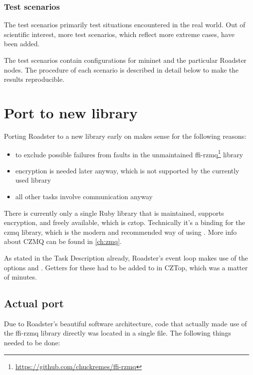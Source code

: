 \subsubsection{Test scenarios}
The test scenarios primarily test situations encountered in the real world. Out
of scientific interest, more test scenarios, which reflect more extreme cases,
have been added.

The test scenarios contain configurations for mininet and the particular Roadster nodes.
The procedure of each scenario is described in detail below to make the results reproducible.


\section{Port to new \zmq library}\label{sec:approach:port}
Porting Roadster to a new \zmq library early on makes sense for the following reasons:

\begin{itemize}
\item to exclude possible failures from faults in the unmaintained ffi-rzmq\footnote{\url{https://github.com/chuckremes/ffi-rzmq}} library
\item encryption is needed later anyway, which is not supported by the currently used library
\item all other tasks involve \zmq communication anyway
\end{itemize}

There is currently only a single Ruby library that is maintained, supports
encryption, and freely available, which is \gls{cztop}. Technically it's a
binding for the \gls{czmq} library, which is the modern and recommended way of
using \zmq. More info about CZMQ can be found in \autoref{ch:zmq}.

As stated in the Task Description already, Roadster's event loop makes use of
the \zmq options  and . Getters for these had to be
added to in CZTop, which was a matter of minutes.

\subsection{Actual port}
Due to Roadster's beautiful software architecture, code that actually made use
of the ffi-rzmq library directly was located in a single file. The following
things needed to be done:

